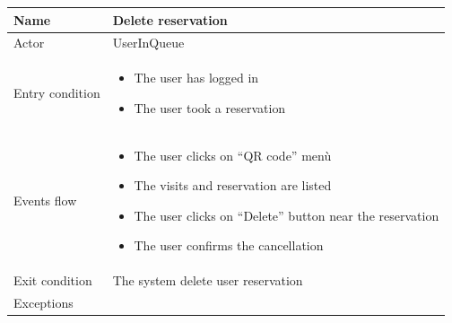 \par \medskip

\begin{tabular}{|p{5cm} | p{7cm} | }
	\hline
	Name & Delete reservation \\
	\hline
	Actor & UserInQueue \\
	\hline
	Entry condition &
	\begin{itemize}
		\item The user has logged in
		\item The user took a reservation
	\end{itemize} \\
	\hline
	Events flow & 
	\begin{itemize}
		\item The user clicks on “QR code” menù
		\item The visits and reservation are listed
		\item The user clicks on “Delete” button near the reservation
		\item The user confirms the cancellation
	\end{itemize} \\
	\hline
	Exit condition &
	The system delete user reservation \\
	\hline 
	Exceptions & \\
	\hline
\end{tabular}

\par \medskip

